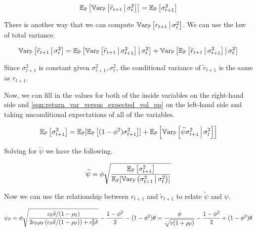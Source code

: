 \documentclass[11pt, letterpaper, twoside, final]{article}
\begin{document}
\begin{equation}
    \label{eqn:return_var_versus_expected_vol_pp}
    \operatorname{\mathbb{E}}_{\mathbb{P}}\left[\operatorname{\mathbb{V}ar}_{\mathbb{P}}\left[\widetilde{r}_{t+1} \,\middle\vert\, \sigma^2_t \right]\right]  =
    \operatorname{\mathbb{E}}_{\mathbb{P}}\left[\sigma^2_{t+1} \right]
\end{equation}

There is another way that we can compute $\operatorname{\mathbb{V}ar}_{\mathbb{P}}\left[r_{t+1} \,\middle\vert\, \sigma^2_t \right]$.
We can use the law of total variance.

\begin{equation}
    \operatorname{\mathbb{V}ar}_{\mathbb{P}}\left[\widetilde{r}_{t+1} \,\middle\vert\, \sigma^2_t\right]  =
    \operatorname{\mathbb{E}}_{\mathbb{P}}\left[\operatorname{\mathbb{V}ar}_{\mathbb{P}}\left[\widetilde{r}_{t+1} \,\middle\vert\, \sigma^2_{t+1}\right] \,\middle\vert\, \sigma_t^2 \right] +
    \operatorname{\mathbb{V}ar}_{\mathbb{P}}\left[\operatorname{\mathbb{E}}_{\mathbb{P}}\left[\widetilde{r}_{t+1}\,\middle\vert\, \sigma_{t+1}^2\right] \,\middle\vert\, \sigma^2_t\right]
\end{equation}

Since $\sigma^2_{t+1}$ is constant given $\sigma^2_{t+1}, \sigma^2_t$, the conditional variance of
$\widetilde{r}_{t+1}$ is the same as $r_{t+1}$.

Now, we can fill in the values for both of the inside variables on the right-hand side and
\cref{eqn:return_var_versus_expected_vol_pp} on the left-hand side and taking unconditional expectations of all of
the variables.

\begin{equation}
    \operatorname{\mathbb{E}}_{\mathbb{P}}\left[\sigma^2_{t+1} \right]  = \operatorname{\mathbb{E}}_{\mathbb{P}}[ \operatorname{\mathbb{E}}_{\mathbb{P}}\left[(1 - \phi^2) \sigma^2_{t+1} \right]] +
    \operatorname{\mathbb{E}}_{\mathbb{P}}\left[\operatorname{\mathbb{V}ar}_{\mathbb{P}}\left[\widetilde{\psi} \sigma^2_{t+1} \,\middle\vert\, \sigma^2_t\right]\right] 
\end{equation}

Solving for $\widetilde{\psi}$ we have the following.

\begin{equation}
    \widetilde{\psi} = \phi \sqrt{\frac{\operatorname{\mathbb{E}}_{\mathbb{P}}\left[\sigma^2_{t+1} \right]}{\operatorname{\mathbb{E}}_{\mathbb{P}}
    [\operatorname{\mathbb{V}ar}_{\mathbb{P}}\left(\sigma^2_{t+1} \,\middle\vert\, \sigma^2_t\right)]}}  
\end{equation}

Now we can use the relationship between $r_{t+1}$ and $\tilde{r}_{t+1}$ to relate $\tilde{\psi}$ and $\psi$.

\begin{equation}
    \label{eqn:psi_pp_as_func_of_params}
    \psi_{\mathbb{P}} = \phi \sqrt{\frac{c_{\mathbb{P}} \delta / (1 - \rho_{\mathbb{P}})}{2 c_{\mathbb{P}} \rho_{\mathbb{P}} \left(c_{\mathbb{P}} \delta /
    (1 - \rho_{\mathbb{P}})\right) + c_{\mathbb{P}}^2 \delta}} - \frac{1- \phi^2}{2} - (1 - \phi^2) \theta = \frac{\phi}{\sqrt{c
    (1 + \rho_{\mathbb{P}})}} - \frac{1 - \phi^2}{2}  + (1 - \phi^2) \theta
\end{equation}
\end{document}
